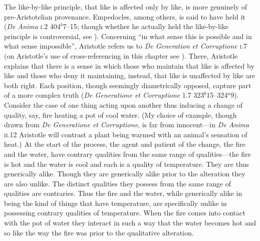 The like-by-like principle, that like is affected only by like, is more genuinely of pre-Aristotelian provenance. Empedocles, among others, is said to have held it (\emph{De Anima} \textsc{i}.2 404\( ^{b} \)7--15; though whether he actually held the like-by-like principle is controversial, see \citealt{Kamtekar:2009fk}). Concerning ``in what sense this is possible and in what sense impossible'', Aristotle refers us to \emph{De Generation et Corruptione} \textsc{i}.7 (on Aristotle's use of cross-referencing in this chapter see \citealt{Burnyeat:2002an}). There, Aristotle explains that there is a sense in which those who maintain that like is affected by like and those who deny it maintaining, instead, that like is unaffected by like are both right. Each position, though seemingly diametrically opposed, capture part of a more complex truth (\emph{De Generatione et Corruptione} \textsc{1}.7 323\( ^{b} \)15--324\( ^{a} \)9). Consider the case of one thing acting upon another thus inducing a change of quality, say, fire heating a pot of cool water. (My choice of example, though drawn from \emph{De Generatione et Corruptione}, is far from innocent---in \emph{De Anima} \textsc{ii}.12 Aristotle will contrast a plant being warmed with an animal's sensation of heat.) At the start of the process, the agent and patient of the change, the fire and the water, have contrary qualities from the same range of qualities---the fire is hot and the water is cool and each is a quality of temperature. They are thus generically alike. Though they are generically alike prior to the alteration they are also unlike. The distinct qualities they possess from the same range of qualities are contraries. Thus the fire and the water, while generically alike in being the kind of things that have temperature, are specifically unlike in possessing contrary qualities of temperature. When the fire comes into contact with the pot of water they interact in such a way that the water becomes hot and so like the way the fire was prior to the qualitative alteration.

